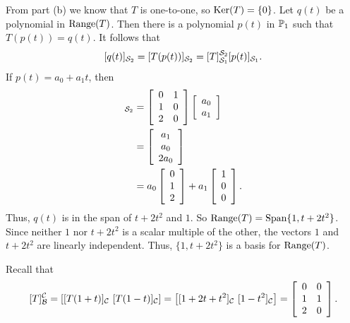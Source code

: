 \begin{example}
\item From part (b) we know that $T$ is one-to-one, so $\text{Ker}(T) = \{0\}$. Let $q(t)$ be a polynomial in $\text{Range}(T)$. Then there is a polynomial $p(t)$ in $\mathbb{P}_1$ such that $T(p(t)) = q(t)$. It follows that 
\[ [q(t)]_{\mathcal{S}_2} = [T(p(t))]_{\mathcal{S}_2} = [T]_{\mathcal{S}_1}^{\mathcal{S}_2}[p(t)]_{\mathcal{S}_1}.\]
If $p(t) = a_0+a_1t$, then 
\begin{align*}
 [q(t)]_{\CS_2}  &= \left[ \begin{array}{cc} 0&1\\1&0\\2&0 \end{array} \right] \left[ \begin{array}{c} a_0\\a_1 \end{array} \right] \\
 	&= \left[ \begin{array}{c} a_1\\a_0\\2a_0 \end{array} \right] \\
	&= a_0\left[ \begin{array}{c} 0\\1\\2 \end{array} \right] + a_1\left[ \begin{array}{c} 1\\0\\0\end{array} \right].
\end{align*}
Thus, $q(t)$ is in the span of $t+2t^2$ and $1$. So $\text{Range}(T) = \text{Span}\{1, t+2t^2\}$.  Since neither $1$ nor $t+2t^2$ is a scalar multiple of the other, the vectors $1$ and $t+2t^2$ are linearly independent. Thus, $\{1, t+2t^2\}$ is a basis for $\text{Range}(T)$. 

\item Recall that 
\[[T]_{\CB}^{\CC} = \left[ [T(1+t)]_{\CC} \ [T(1-t)]_{\CC} \right] = \left[ [1+2t+t^2]_{\CC} \ [1-t^2]_{\CC} \right] = \left[ \begin{array}{cc} 0&0\\1&1\\2&0 \end{array} \right].\]


\end{example}
